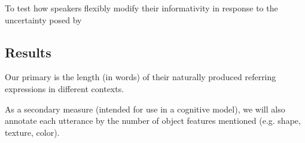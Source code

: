 \documentclass[manuscript]{stjour}
\begin{document}
 To test how speakers flexibly modify their informativity in response to the uncertainty posed by 

\subsection{Results}

Our primary is the length (in words) of their naturally produced referring expressions in different contexts. 

As a secondary measure (intended for use in a cognitive model), we will also annotate each utterance by the number of object features mentioned (e.g. shape, texture, color). 

%
%
%
%
%
\end{document}
